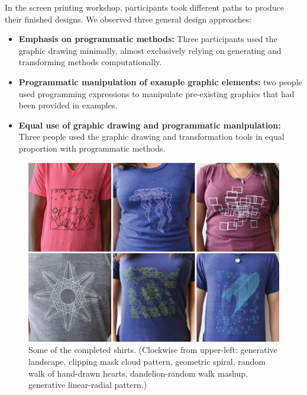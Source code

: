 \documentclass{sigchi}
\begin{document}
In the screen printing workshop, participants took different paths to produce their finished designs. We observed three general design approaches: 

\begin{itemize}
\item \textbf{Emphasis on programmatic methods:} Three participants used the graphic drawing minimally, almost exclusively relying on generating and transforming methods computationally. 
\item \textbf{Programmatic manipulation of example graphic elements:} two people used programming expressions to manipulate pre-existing graphics that had been provided in examples.
\item \textbf{Equal use of graphic drawing and programmatic manipulation:} Three people used the graphic drawing and transformation tools in equal proportion with programmatic methods.
\end{itemize}

\begin{center}
\begin{figure}[h!]
\includegraphics[width=\columnwidth]{images/shirt_results.jpg}
\caption{Some of the completed shirts. (Clockwise from upper-left: generative landscape, clipping mask cloud pattern, geometric spiral, random walk of hand-drawn hearts, dandelion-random walk mashup, generative linear-radial pattern.) }
\label{fig:screen_results}
\end{figure}
\end{center}
\vspace{-20pt}
\end{document}
